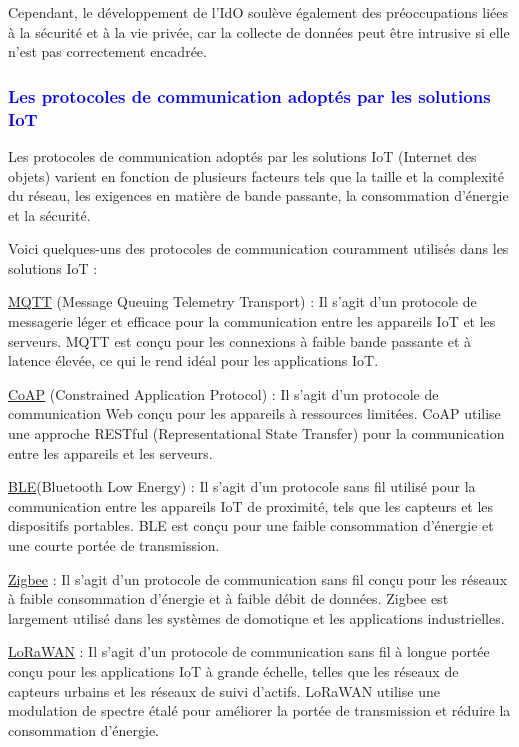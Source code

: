 \begin{flushleft}
	Cependant, le développement de l'IdO soulève également des préoccupations liées à la sécurité et à la vie privée, car la collecte de données peut être intrusive si elle n'est pas correctement encadrée.\newline
	\subsubsection{\textcolor{blue}{Les protocoles de communication adoptés par les solutions IoT}}

	Les protocoles de communication adoptés par les solutions IoT (Internet des objets) varient en fonction de plusieurs facteurs tels que la taille et la complexité du réseau, les exigences en matière de bande passante, la consommation d'énergie et la sécurité.\newline
	
	Voici quelques-uns des protocoles de communication couramment utilisés dans les solutions IoT :\newline
	
	\underline{MQTT} (Message Queuing Telemetry Transport) : Il s'agit d'un protocole de messagerie léger et efficace pour la communication entre les appareils IoT et les serveurs. MQTT est conçu pour les connexions à faible bande passante et à latence élevée, ce qui le rend idéal pour les applications IoT.\newline
	
	\underline{CoAP} (Constrained Application Protocol) : Il s'agit d'un protocole de communication Web conçu pour les appareils à ressources limitées. CoAP utilise une approche RESTful (Representational State Transfer) pour la communication entre les appareils et les serveurs.\newline
	
	\underline{BLE}(Bluetooth Low Energy) : Il s'agit d'un protocole sans fil utilisé pour la communication entre les appareils IoT de proximité, tels que les capteurs et les dispositifs portables. BLE est conçu pour une faible consommation d'énergie et une courte portée de transmission.\newline
	
	\underline{Zigbee} : Il s'agit d'un protocole de communication sans fil conçu pour les réseaux à faible consommation d'énergie et à faible débit de données. Zigbee est largement utilisé dans les systèmes de domotique et les applications industrielles.\newline
	
	\underline{LoRaWAN} : Il s'agit d'un protocole de communication sans fil à longue portée conçu pour les applications IoT à grande échelle, telles que les réseaux de capteurs urbains et les réseaux de suivi d'actifs. LoRaWAN utilise une modulation de spectre étalé pour améliorer la portée de transmission et réduire la consommation d'énergie.\newline
	

\end{flushleft}
